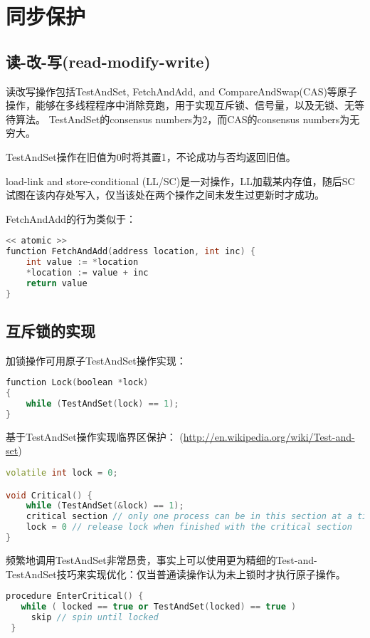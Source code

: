 \section{同步保护}

\subsection{读-改-写(read-modify-write)}
读改写操作包括TestAndSet, FetchAndAdd, and CompareAndSwap(CAS)等原子操作，能够在多线程程序中消除竞跑，用于实现互斥锁、信号量，以及无锁、无等待算法。
TestAndSet的consensus numbers为2，而CAS的consensus numbers为无穷大。

TestAndSet操作在旧值为0时将其置1，不论成功与否均返回旧值。

load-link and store-conditional (LL/SC)是一对操作，LL加载某内存值，随后SC试图在该内存处写入，仅当该处在两个操作之间未发生过更新时才成功。

FetchAndAdd的行为类似于：
\begin{lstlisting}[language=C++]
<< atomic >>
function FetchAndAdd(address location, int inc) {
    int value := *location
    *location := value + inc
    return value
}
\end{lstlisting}


\subsection{互斥锁的实现}

加锁操作可用原子TestAndSet操作实现：
\begin{lstlisting}[language=C++]
function Lock(boolean *lock)
{
    while (TestAndSet(lock) == 1);
}
\end{lstlisting}

基于TestAndSet操作实现临界区保护：
(\url{http://en.wikipedia.org/wiki/Test-and-set})
\begin{lstlisting}[language=C++]
volatile int lock = 0;

void Critical() {
    while (TestAndSet(&lock) == 1);
    critical section // only one process can be in this section at a time
    lock = 0 // release lock when finished with the critical section
}
\end{lstlisting}

频繁地调用TestAndSet非常昂贵，事实上可以使用更为精细的Test-and-TestAndSet技巧来实现优化：仅当普通读操作认为未上锁时才执行原子操作。
\begin{lstlisting}[language=C++]
 procedure EnterCritical() {
   while ( locked == true or TestAndSet(locked) == true )
     skip // spin until locked
 }
\end{lstlisting}

